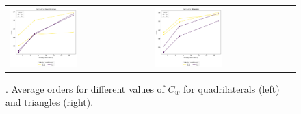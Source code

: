 \begin{figure}[h!]
	\centering
	\begin{tabular}{p{} p{}}
		\vspace{0pt}
		\includegraphics[width=0.49\textwidth]{../figs/parametric/burgers_2D/orders_2_4}
		&
		\vspace{0pt}
		\includegraphics[width=0.49\textwidth]{../figs/parametric/burgers_2D/orders_2_3}
	\end{tabular}
	\caption{. Average orders for different values of $C_w$ for
	quadrilaterals (left) and triangles (right).}
	\label{fig:kucera_orders}
\end{figure}


